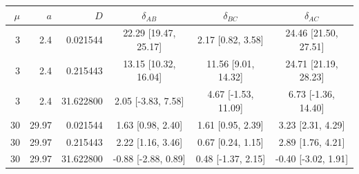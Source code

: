 \begin{tabular}{rrrccc}
\toprule
$\mu$ & $a$ & $D$ & $\delta_{AB}$ & $\delta_{BC}$ & $\delta_{AC}$ \\
\midrule
3 & 2.4 & 0.021544 & 22.29 [19.47, 25.17] & 2.17 [0.82, 3.58] & 24.46 [21.50, 27.51] \\
3 & 2.4 & 0.215443 & 13.15 [10.32, 16.04] & 11.56 [9.01, 14.32] & 24.71 [21.19, 28.23] \\
3 & 2.4 & 31.622800 & 2.05 [-3.83, 7.58] & 4.67 [-1.53, 11.09] & 6.73 [-1.36, 14.40] \\
30 & 29.97 & 0.021544 & 1.63 [0.98, 2.40] & 1.61 [0.95, 2.39] & 3.23 [2.31, 4.29] \\
30 & 29.97 & 0.215443 & 2.22 [1.16, 3.46] & 0.67 [0.24, 1.15] & 2.89 [1.76, 4.21] \\
30 & 29.97 & 31.622800 & -0.88 [-2.88, 0.89] & 0.48 [-1.37, 2.15] & -0.40 [-3.02, 1.91] \\
\bottomrule
\end{tabular}
